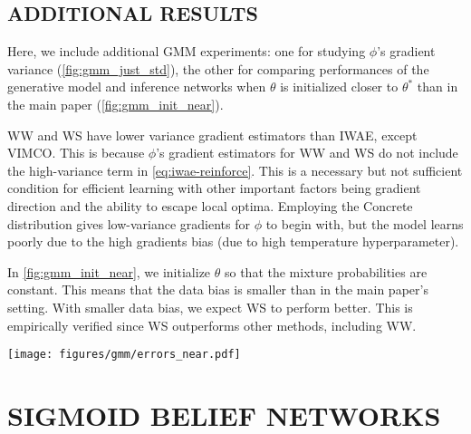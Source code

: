 \subsection{ADDITIONAL RESULTS}
\label{app:gmm/additional}

Here, we include additional \gls{GMM} experiments:
one for studying $\phi$'s gradient variance (\cref{fig:gmm_just_std}),
the other for comparing performances of the generative model and inference networks when $\theta$ is initialized closer to $\theta^*$ than in the main paper (\cref{fig:gmm_init_near}).

\Gls{WW} and \gls{WS} have lower variance gradient estimators than \gls{IWAE}, except \gls{VIMCO}.
%
This is because $\phi$'s gradient estimators for \gls{WW} and \gls{WS} do not include the high-variance term  in \cref{eq:iwae-reinforce}.
%
This is a necessary but not sufficient condition for efficient learning with other important factors being gradient direction and the ability to escape local optima.
%
Employing the Concrete distribution gives low-variance gradients for $\phi$ to begin with, but the model learns poorly due to the high gradients bias (due to high temperature hyperparameter).

In \cref{fig:gmm_init_near}, we initialize $\theta$ so that the mixture probabilities are constant.
This means that the data bias is smaller than in the main paper's setting.
With smaller data bias, we expect \gls{WS} to perform better.
This is empirically verified since \gls{WS} outperforms other methods, including \gls{WW}.


\begin{figure*}[!ht]
  \centering
  \texttt{[image: figures/gmm/errors\_near.pdf]}
  \vspace*{-4ex}
  \caption{
    \Gls{GMM} training when $p_\theta(x)$ is close to $p_{\theta^*}(x)$.
    \Gls{WS} outperforms other methods including \gls{WW} in generative model (top) and inference network (middle) learning.
    \Gls{VIMCO} has the lowest gradient variance (bottom) but still performs worse than \gls{WS} and results in worsening of the inference network as number of particles is increased.
  }
  \label{fig:gmm_init_near}
  \vspace*{-2ex}
\end{figure*}

\section{SIGMOID BELIEF NETWORKS}
\label{app:sigmoid_belief_nets}

